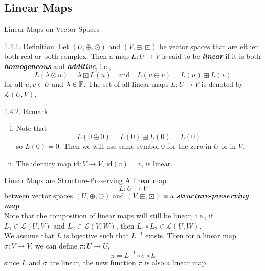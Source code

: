 \documentclass[hyperref={pdfpagelabels=true}]{beamer}
\newcommand{\highlightg}[1]{\textcolor[rgb]{0.1,0.5,0.3}{\emph{\textbf{#1}}}}
\newcommand{\<}{\langle}
\renewcommand{\>}{\rangle}
\begin{document}
\subsection{Linear Maps}
\begin{frame}{Linear Maps on Vector Spaces}
    \begin{block}{1.4.1. Definition.}
        Let $(U,\oplus,\odot)$ and $(V,\boxplus,\boxdot)$ be vector spaces that are either both real or both complex. Then a map $L:U \rightarrow V$ is said to be \highlightg{linear} if it is both \highlightg{homogeneous} and \highlightg{additive}, i.e.,
        \[L(\lambda \odot u ) = \lambda \boxdot L(u) \quad \text{and} \quad L(u \oplus v) = L(u)\boxplus L(v)\]
        for all $u,v \in U$ and $\lambda \in \mathbb{F}$. The set of all linear maps $L:U \rightarrow V$ is denoted by $\mathcal{L}(U,V)$.
    \end{block}
    \begin{block}{1.4.2. Remark.}
        \begin{enumerate}[(i)]
        \item Note that 
        \[L(0 \oplus 0) = L(0) \boxplus L(0) = L(0)\]
        so $L(0) = 0$. Then we will use same symbol $0$ for the zero in $U$ or in $V$.
        \item The identity map $\text{id}: V \rightarrow V$, $\text{id}(v) = v$, is linear.
        \end{enumerate}
    \end{block}
\end{frame}
\begin{frame}{Linear Maps are Structure-Preserving}
    A linear map
    \[L:U \rightarrow V\]
    between vector spaces $(U,\oplus,\odot)$ and $(V,\boxplus,\boxdot)$ is a \highlightg{structure-preserving map}.\\
    Note that the composition of linear maps will still be linear, i.e., if $L_{1} \in \mathcal{L}(U,V)$ and $L_{2} \in \mathcal{L}(V,W)$, then $L_{1} \circ L_{2} \in \mathcal{L}(U,W)$.\\
    We assume that $L$ is bijective such that $L^{-1}$ exists. Then for a linear map $\sigma:V \rightarrow V$, we can define $\pi:U \rightarrow U,$
    \[\pi = L^{-1} \circ \sigma \circ L\]
    since $L$ and $\sigma$ are linear, the new function $\pi$ is also a linear map.
    \begin{center}
    \end{center}
\end{frame}
\end{document}
